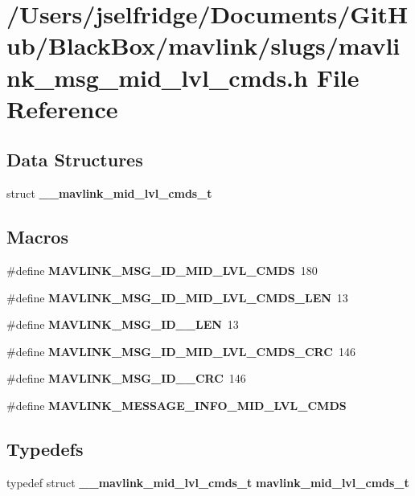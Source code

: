\section{/\+Users/jselfridge/\+Documents/\+Git\+Hub/\+Black\+Box/mavlink/slugs/mavlink\+\_\+msg\+\_\+mid\+\_\+lvl\+\_\+cmds.h File Reference}
\label{mavlink__msg__mid__lvl__cmds_8h}
\subsection*{Data Structures}
\begin{DoxyCompactItemize}
\item 
struct \textbf{ \+\_\+\+\_\+mavlink\+\_\+mid\+\_\+lvl\+\_\+cmds\+\_\+t}
\end{DoxyCompactItemize}
\subsection*{Macros}
\begin{DoxyCompactItemize}
\item 
\#define \textbf{ M\+A\+V\+L\+I\+N\+K\+\_\+\+M\+S\+G\+\_\+\+I\+D\+\_\+\+M\+I\+D\+\_\+\+L\+V\+L\+\_\+\+C\+M\+DS}~180
\item 
\#define \textbf{ M\+A\+V\+L\+I\+N\+K\+\_\+\+M\+S\+G\+\_\+\+I\+D\+\_\+\+M\+I\+D\+\_\+\+L\+V\+L\+\_\+\+C\+M\+D\+S\+\_\+\+L\+EN}~13
\item 
\#define \textbf{ M\+A\+V\+L\+I\+N\+K\+\_\+\+M\+S\+G\+\_\+\+I\+D\+\_\+\_\+\+L\+EN}~13
\item 
\#define \textbf{ M\+A\+V\+L\+I\+N\+K\+\_\+\+M\+S\+G\+\_\+\+I\+D\+\_\+\+M\+I\+D\+\_\+\+L\+V\+L\+\_\+\+C\+M\+D\+S\+\_\+\+C\+RC}~146
\item 
\#define \textbf{ M\+A\+V\+L\+I\+N\+K\+\_\+\+M\+S\+G\+\_\+\+I\+D\+\_\+\_\+\+C\+RC}~146
\item 
\#define \textbf{ M\+A\+V\+L\+I\+N\+K\+\_\+\+M\+E\+S\+S\+A\+G\+E\+\_\+\+I\+N\+F\+O\+\_\+\+M\+I\+D\+\_\+\+L\+V\+L\+\_\+\+C\+M\+DS}
\end{DoxyCompactItemize}
\subsection*{Typedefs}
\begin{DoxyCompactItemize}
\item 
typedef struct \textbf{ \+\_\+\+\_\+mavlink\+\_\+mid\+\_\+lvl\+\_\+cmds\+\_\+t} \textbf{ mavlink\+\_\+mid\+\_\+lvl\+\_\+cmds\+\_\+t}
\end{DoxyCompactItemize}


